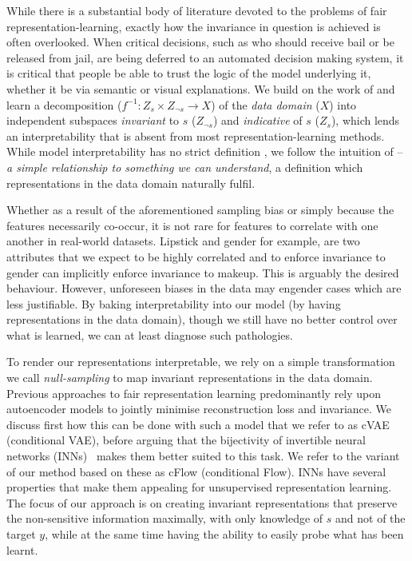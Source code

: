 While there is a substantial body of literature devoted to the problems of fair
representation-learning, exactly how the invariance in question is achieved is often overlooked.
When critical decisions, such as who should receive bail or be released from jail, are being
deferred to an automated decision making system, it is critical that people be able to trust the
logic of the model underlying it, whether it be via semantic or visual explanations. We build on
the work of \citet{QuaShaTho19} and learn a decomposition ($f^{-1}: Z_s \times Z_{\neg s}
\rightarrow X$) of the \emph{data domain} ($X$) into independent subspaces \emph{invariant} to  $s$
($Z_{\neg s}$) and \emph{indicative} of $s$ ($Z_{s}$), which lends an interpretability that is
absent from most representation-learning methods. While model interpretability has no strict
definition \citep{zhang2018visual}, we follow the intuition of \citet{adel2018discovering} --
\emph{a simple relationship to something we can understand}, a definition which representations in
the data domain naturally fulfil.

Whether as a result of the aforementioned sampling bias or simply because the features necessarily
co-occur, it is not rare for features to correlate with one another in real-world datasets.
Lipstick and gender for example, are two attributes that we expect to be highly correlated and to
enforce invariance to gender can implicitly enforce invariance to makeup. This is arguably the
desired behaviour. However, unforeseen biases in the data may engender cases which are less
justifiable. By baking interpretability into our model (by having representations in the data
domain), though we still have no better control over what is learned, we can at least diagnose such
pathologies.

To render our representations interpretable, we rely on a simple transformation we call
\emph{null-sampling} to map invariant representations in the data domain. Previous approaches to
fair representation learning
\citep{beutel2017data,edwards2016censoring,madras2018learning,louizos2016variational} predominantly
rely upon autoencoder models to jointly minimise reconstruction loss and invariance. We discuss
first how this can be done with such a model that we refer to as cVAE (conditional VAE), before
arguing that the bijectivity of invertible neural networks (INNs)~\citep{Dinh2014} makes them
better suited to this task. We refer to the variant of our method based on these as cFlow
(conditional Flow). INNs have several properties that make them appealing for unsupervised
representation learning. The focus of our approach is on creating invariant representations that
preserve the non-sensitive information maximally, with only knowledge of $s$ and not of the target
$y$, while at the same time having the ability to easily probe what has been learnt.


